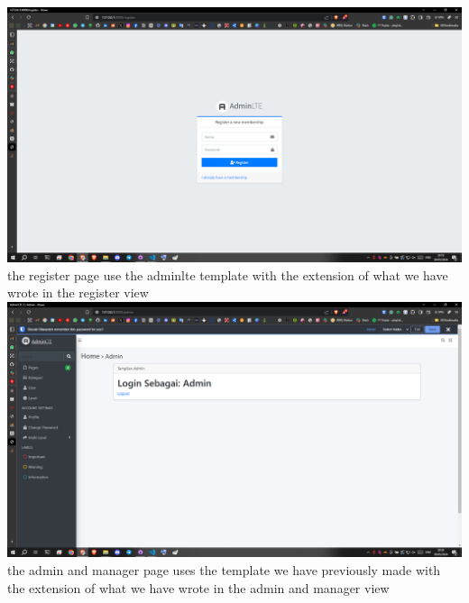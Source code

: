\documentclass[12pt,titlepage]{article}
\begin{document}
\\
\includegraphics[width=.99\textwidth]{images/figures/Screenshot (472).png} \\ the register page use the adminlte template with the extension of what we have wrote in the register view 
\\
\includegraphics[width=.99\textwidth]{images/figures/Screenshot (473).png} \\ the admin and manager page uses the template we have previously made with the extension of what we have wrote in the admin and manager view 
\\
\end{document}
